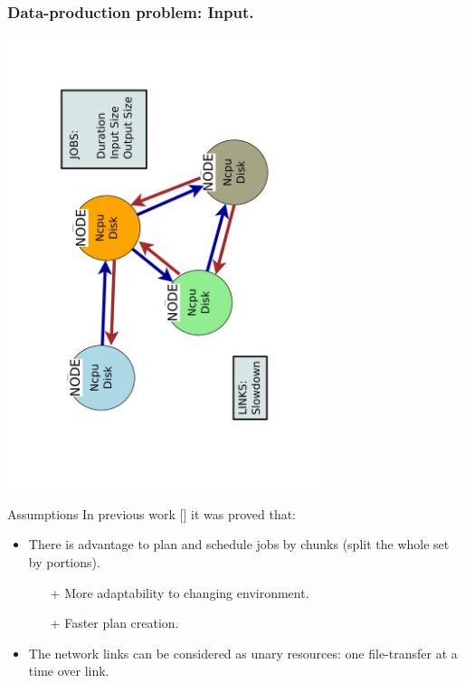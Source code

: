 \documentclass{beamer}
\begin{document}
\begin{frame}\frametitle{Data-production problem: Input.}
\vspace{-1cm}
\begin{center}
 	\includegraphics[trim= 30mm 0mm 10mm 0mm,clip,angle =-90, width=0.7\textwidth]{pic/network.pdf}
\end{center}
\vspace{-12mm}
\begin{block}{Assumptions}
In previous work [\cite{Zerola}] it was proved that:
		\begin{itemize}
			\item There is advantage to plan and schedule jobs by chunks (split the whole set by portions). 
					\begin{itemize}
					\item[+]More adaptability to changing environment.
					\item[+]Faster plan creation.
					\end{itemize}				
			\item The network links can be considered as unary resources: one file-transfer at a time over link.
		\end{itemize}
 	\end{block}
\end{frame}
\end{document}
